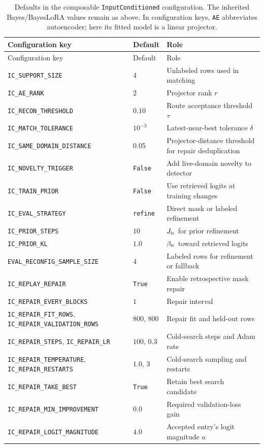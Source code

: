 \documentclass[11pt]{article}
\begin{document}
\begin{longtable}{@{}p{.40\linewidth}p{.16\linewidth}p{.35\linewidth}@{}}
\caption{Defaults in the composable \texttt{InputConditioned} configuration.
The inherited Bayes/BayesLoRA values remain as above. In configuration keys,
\texttt{AE} abbreviates autoencoder; here its fitted model is a linear projector.}\\
\toprule
Configuration key & Default & Role \\
\midrule
\endfirsthead
\toprule Configuration key & Default & Role \\ \midrule
\endhead
\texttt{IC\_SUPPORT\_SIZE} & $4$ & Unlabeled rows used in matching \\
\texttt{IC\_AE\_RANK} & $2$ & Projector rank $r$ \\
\texttt{IC\_RECON\_THRESHOLD} & $0.10$ & Route acceptance threshold $\tau$ \\
\texttt{IC\_MATCH\_TOLERANCE} & $10^{-3}$ & Latest-near-best tolerance $\delta$ \\
\texttt{IC\_SAME\_DOMAIN\_DISTANCE} & $0.05$ & Projector-distance threshold for repair deduplication \\
\texttt{IC\_NOVELTY\_TRIGGER} & \texttt{False} & Add live-domain novelty to detector \\
\texttt{IC\_TRAIN\_PRIOR} & \texttt{False} & Use retrieved logits at training changes \\
\texttt{IC\_EVAL\_STRATEGY} & \texttt{refine} & Direct mask or labeled refinement \\
\texttt{IC\_PRIOR\_STEPS} & $10$ & $J_{\rm ic}$ for prior refinement \\
\texttt{IC\_PRIOR\_KL} & $1.0$ & $\beta_{\rm ic}$ toward retrieved logits \\
\texttt{EVAL\_RECONFIG\_SAMPLE\_SIZE} & $4$ & Labeled rows for refinement or fallback \\
\texttt{IC\_REPLAY\_REPAIR} & \texttt{True} & Enable retrospective mask repair \\
\texttt{IC\_REPAIR\_EVERY\_BLOCKS} & $1$ & Repair interval \\
\texttt{IC\_REPAIR\_FIT\_ROWS}, \texttt{IC\_REPAIR\_VALIDATION\_ROWS} & $800$, $800$ & Repair fit and held-out rows \\
\texttt{IC\_REPAIR\_STEPS}, \texttt{IC\_REPAIR\_LR} & $100$, $0.3$ & Cold-search steps and Adam rate \\
\texttt{IC\_REPAIR\_TEMPERATURE}, \texttt{IC\_REPAIR\_RESTARTS} & $1.0$, $3$ & Cold-search sampling and restarts \\
\texttt{IC\_REPAIR\_TAKE\_BEST} & \texttt{True} & Retain best search candidate \\
\texttt{IC\_REPAIR\_MIN\_IMPROVEMENT} & $0.0$ & Required validation-loss gain \\
\texttt{IC\_REPAIR\_LOGIT\_MAGNITUDE} & $4.0$ & Accepted entry's logit magnitude $a$ \\
\bottomrule
\end{longtable}
\end{document}
